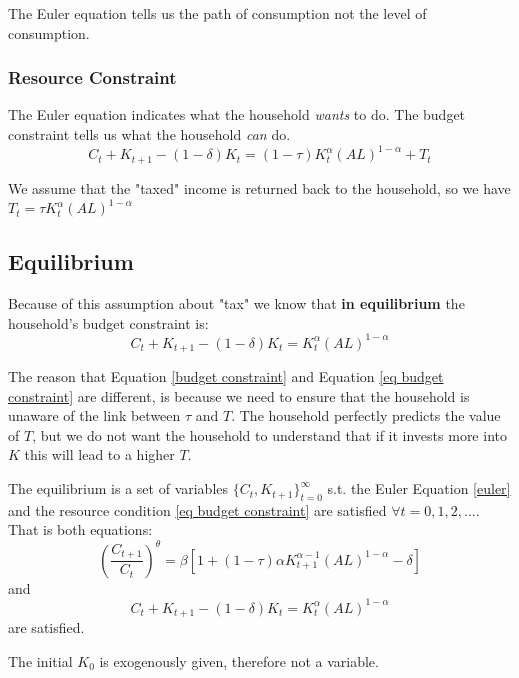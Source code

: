 \documentclass[11pt]{article}
\begin{document}
The Euler equation tells us the path of consumption not the level of consumption.

\subsubsection{Resource Constraint}

The Euler equation indicates what the household \textit{wants} to do. The budget constraint tells us what the household \textit{can} do.
\begin{equation}
    \label{budget constraint}
    C_t + K_{t+1} - (1-\delta)K_t = (1-\tau)K_t^\alpha (AL)^{1-\alpha} + T_t
\end{equation}

We assume that the "taxed" income is returned back to the household, so we have $T_t = \tau K_t^\alpha(AL)^{1-\alpha}$

\subsection{Equilibrium}

Because of this assumption about "tax" we know that \textbf{in equilibrium} the household's budget constraint is:
\begin{equation}
    \label{eq budget constraint}
    C_t + K_{t+1} - (1-\delta)K_t = K_t^\alpha(AL)^{1-\alpha}
\end{equation}

\begin{note}
    The reason that Equation \eqref{budget constraint} and Equation \eqref{eq budget constraint} are different, is because we need to ensure that the household is unaware of the link between $\tau$ and $T$. The household perfectly predicts the value of $T$, but we do not want the household to understand that if it invests more into $K$ this will lead to a higher $T$.
\end{note}

\begin{shaded}
    The equilibrium is a set of variables $\{C_t, K_{t+1}\}_{t=0}^\infty$ s.t. the Euler Equation \eqref{euler} and the resource condition \eqref{eq budget constraint} are satisfied $\forall t = 0,1,2,\ldots$. That is both equations:
    \[\left(\frac{C_{t+1}}{C_t}\right)^\theta=\beta\left[1+(1-\tau) \alpha K_{t+1}^{\alpha-1}(A L)^{1-\alpha}-\delta\right]\]
    and
    \[C_t + K_{t+1} - (1-\delta)K_t = K_t^\alpha(AL)^{1-\alpha}\]
    are satisfied.
    \begin{note}
        The initial $K_0$ is exogenously given, therefore not a variable.
    \end{note}
\end{shaded}
\end{document}
